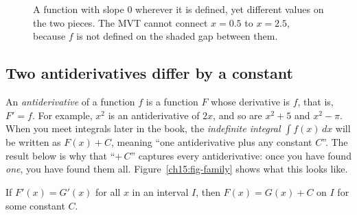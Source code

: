 \begin{figure}[htbp]
\centering
{}
\caption{A function with slope $0$ wherever it is defined, yet different values on the
two pieces. The MVT cannot connect $x=0.5$ to $x=2.5$, because $f$ is not defined on
the shaded gap between them.}
\label{ch15:fig-gap-domain}
\end{figure}

\subsection{Two antiderivatives differ by a constant}

An \emph{antiderivative} of a function $f$ is a function $F$ whose derivative is
$f$, that is, $F'=f$. For example, $x^2$ is an antiderivative of $2x$, and so are
$x^2+5$ and $x^2-\pi$. When you meet integrals later in the book, the
\emph{indefinite integral} $\int f(x)\,dx$ will be written as $F(x)+C$, meaning
``one antiderivative plus any constant $C$''. The result below is why that
``$+\,C$'' captures every antiderivative: once you have found \emph{one}, you have
found them all. Figure~\ref{ch15:fig-family} shows what this looks like.

\begin{corollary}\label{ch15:cor-plusC}
If $F'(x)=G'(x)$ for all $x$ in an interval $I$, then $F(x)=G(x)+C$ on $I$ for some
constant $C$.
\end{corollary}

